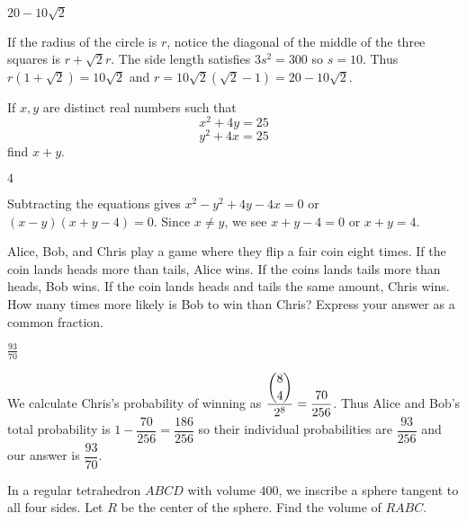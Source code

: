 \documentclass[11pt]{article}
\begin{document}
\begin{answer}
$\boxed{20-10\sqrt{2}}$
\end{answer}

\begin{solution}
If the radius of the circle is $r$, notice the diagonal of the middle of the three squares is $r + \sqrt2 r$. The side length satisfies $3s^2 = 300$ so $s = 10$. Thus $r(1 + \sqrt2) = 10\sqrt2$ and $r = 10\sqrt2 (\sqrt2 - 1) = \boxed{20 - 10\sqrt{2}}$. 
\end{solution}


\begin{problem}
If $x,y$ are distinct real numbers such that \[ x^2 + 4y = 25 \] \[y^2 + 4x = 25\] find $x+y$.
\end{problem}

\begin{answer}
$\boxed{4}$
\end{answer}

\begin{solution}
Subtracting the equations gives $x^2 - y^2 + 4y - 4x = 0$ or $(x-y)(x+y-4) = 0$. Since $x \ne y$, we see $x+y -4 = 0$ or $x+y = \boxed{4}$. 
\end{solution}


\begin{problem}
Alice, Bob, and Chris play a game where they flip a fair coin eight times. If the coin lands heads more than tails, Alice wins. If the coins lands tails more than heads, Bob wins. If the coin lands heads and tails the same amount, Chris wins. How many times more likely is Bob to win than Chris? Express your answer as a common fraction.
\end{problem}

\begin{answer}
$\boxed{\frac{93}{70}}$
\end{answer}

\begin{solution}
We calculate Chris's probability of winning as $\dfrac{\dbinom{8}{4}}{2^8}  = \dfrac{70}{256}$. Thus Alice and Bob's total probability is $1 - \dfrac{70}{256} = \dfrac{186}{256}$ so their individual probabilities are $\dfrac{93}{256}$ and our answer is $\boxed{\dfrac{93}{70}}$. 
\end{solution}


\begin{problem}
In a regular tetrahedron $ABCD$ with volume $400$, we inscribe a sphere tangent to all four sides. Let $R$ be the center of the sphere. Find the volume of $RABC$.
\end{problem}
\end{document}
